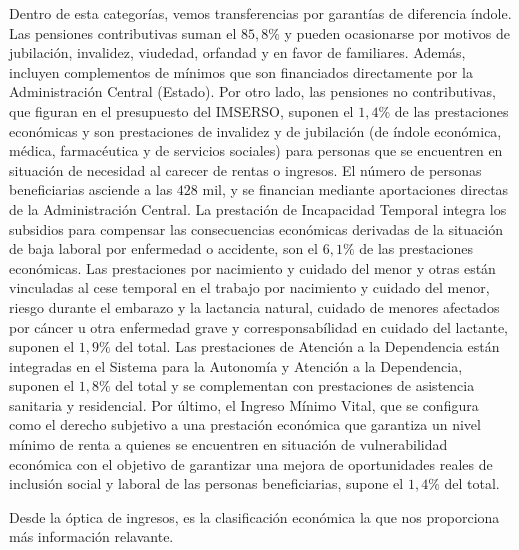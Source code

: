 \documentclass[10pt,a4paper]{article}
\begin{document}
Dentro de esta categorías, vemos transferencias por garantías de diferencia índole. Las pensiones contributivas suman el $85,8\%$ y pueden ocasionarse por motivos de jubilación, invalidez, viudedad, orfandad y en favor de familiares. Además, incluyen complementos de mínimos que son financiados directamente por la Administración Central (Estado). Por otro lado, las pensiones no contributivas, que figuran en el presupuesto del IMSERSO, suponen el $1,4\%$ de las prestaciones económicas y son prestaciones de invalidez y de jubilación (de índole económica, médica, farmacéutica y de servicios sociales) para personas que se encuentren en situación de necesidad al carecer de rentas o ingresos. El número de personas beneficiarias asciende a las $428$ mil, y se financian mediante aportaciones directas de la Administración Central. La prestación de Incapacidad Temporal integra los subsidios para compensar las consecuencias económicas derivadas de la situación de baja laboral por enfermedad o accidente, son el $6,1\%$ de las prestaciones económicas. Las prestaciones por nacimiento y cuidado del menor y otras están vinculadas al cese temporal en el trabajo por nacimiento y cuidado del menor, riesgo durante el embarazo y la lactancia natural, cuidado de menores afectados por cáncer u otra enfermedad grave y corresponsabílidad en cuidado del lactante, suponen el $1,9\%$ del total. Las prestaciones de Atención a la Dependencia están integradas en el Sistema para la Autonomía y Atención a la Dependencia, suponen el $1,8\%$ del total y se complementan con prestaciones de asistencia sanitaria y residencial. Por último, el Ingreso Mínimo Vital, que se configura como el derecho subjetivo a una prestación económica que garantiza un nivel mínimo de renta a quienes se encuentren en situación de vulnerabilidad económica con el objetivo de garantizar una mejora de oportunidades reales de inclusión social y laboral de las personas beneficiarias, supone el $1,4\%$ del total.


Desde la óptica de ingresos, es la clasificación económica la que nos proporciona más información relavante. 
\end{document}
